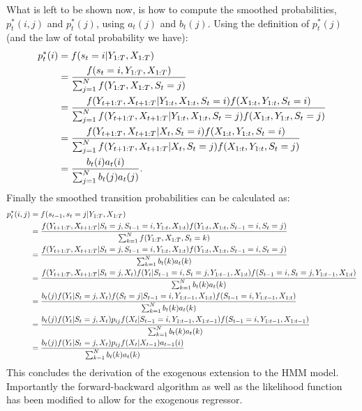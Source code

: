 \documentclass[11pt,a4paper,oneside]{article}
\begin{document}
What is left to be shown now, is how to compute the smoothed probabilities, $p_t^*(i,j)$ and $p_t^*(j)$, using $a_t(j)$ and $b_t(j)$. Using the definition of $p_t^*(j)$ (and the law of total probability we have):
\begin{align}
    p_t^*(i)&= f(s_t=i \vert Y_{1:T},X_{1:T}) \notag \\
            &=\frac{f(s_t=i,Y_{1:T},X_{1:T})}{\sum_{j=1}^{N}f(Y_{1:T},X_{1:T},S_t=j)} \notag \\
            &=\frac{f(Y_{t+1:T},X_{t+1:T} \vert Y_{1:t},X_{1:t},S_t=i  )f(X_{1:t},Y_{1:t},S_t=i)}{\sum_{j=1}^{N}f(Y_{t+1:T},X_{t+1:T} \vert Y_{1:t},X_{1:t},S_t=j  )f(X_{1:t},Y_{1:t},S_t=j)} \notag \\
            &=\frac{f(Y_{t+1:T},X_{t+1:T} \vert X_{t},S_t=i  )f(X_{1:t},Y_{1:t},S_t=i)}{\sum_{j=1}^{N}f(Y_{t+1:T},X_{t+1:T} \vert X_{t},S_t=j  )f(X_{1:t},Y_{1:t},S_t=j)} \notag \\
            &=\frac{b_t(i)a_t(i)}{\sum_{j=1}^{N}b_t(j)a_t(j)}.
\end{align}
Finally the smoothed transition probabilities can be calculated as:
\begin{align}
    p_t^*(i,j)&=f(s_{t-1},s_t=j\vert Y_{1:T},X_{1:T}) \notag \\
              &=\frac{f(Y_{t+1:T},X_{t+1:T}\vert S_{t}=j,S_{t-1}=i,Y_{1:t},X_{1:t})f(Y_{1:t},X_{1:t},S_{t-1}=i,S_t=j)}{\sum_{k=1}^{N}f(Y_{1:T},X_{1:T},S_t=k)} \notag \\
              &=\frac{f(Y_{t+1:T},X_{t+1:T}\vert S_{t}=j,S_{t-1}=i,Y_{1:t},X_{1:t})f(Y_{1:t},X_{1:t},S_{t-1}=i,S_t=j)}{\sum_{k=1}^{N}b_t(k)a_t(k)} \notag \\
              &=\frac{f(Y_{t+1:T},X_{t+1:T}\vert S_{t}=j,X_t)f(Y_t\vert S_{t-1}=i,S_t=j,Y_{1:t-1},X_{1:t})f(S_{t-1}=i,S_t=j,Y_{1:t-1},X_{1:t})}{\sum_{k=1}^{N}b_t(k)a_t(k)} \notag \\
              &=\frac{b_t(j)f(Y_t\vert S_t=j,X_t)f(S_t=j\vert S_{t-1}=i,Y_{1:t-1},X_{1:t})f(S_{t-1}=i,Y_{1:t-1},X_{1:t})}{\sum_{k=1}^{N}b_t(k)a_t(k)} \notag \\
              &=\frac{b_t(j)f(Y_t\vert S_t=j,X_t)p_{ij}f(X_t\vert S_{t-1}=i,Y_{1:t-1},X_{1:t-1})f(S_{t-1}=i,Y_{1:t-1},X_{1:t-1})}{\sum_{k=1}^{N}b_t(k)a_t(k)} \notag \\
              &=\frac{b_t(j)f(Y_t\vert S_t=j,X_t)p_{ij}f(X_t\vert X_{t-1})a_{t-1}(i)}{\sum_{k=1}^{N}b_t(k)a_t(k)}
\end{align}
\newpage
\noindent This concludes the derivation of the exogenous extension to the HMM model. Importantly the forward-backward algorithm as well as the likelihood function has been modified to allow for the exogenous regressor.  
\end{document}
